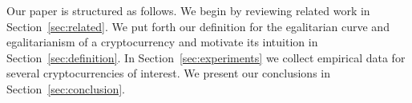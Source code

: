 Our paper is structured as follows. We begin by reviewing related work in
Section~\ref{sec:related}. We put forth our definition for the egalitarian curve
and egalitarianism of a cryptocurrency and motivate its intuition in
Section~\ref{sec:definition}. In Section~\ref{sec:experiments} we collect
empirical data for several cryptocurrencies of interest. We present our
conclusions in Section~\ref{sec:conclusion}.

